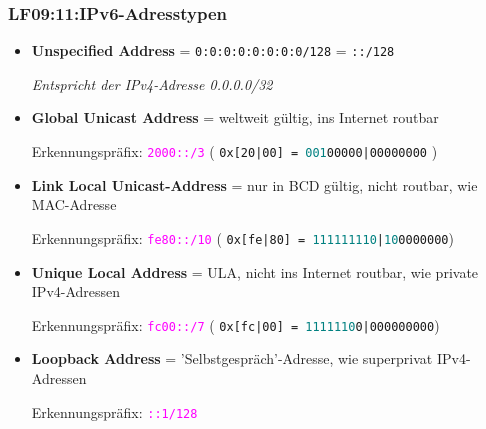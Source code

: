 \begin{frame}
  \frametitle{LF09:11:IPv6-Adresstypen}

  \begin{footnotesize}

  \begin{itemize}
    \item \textbf{Unspecified Address} = \texttt{0:0:0:0:0:0:0:0/128} = \texttt{::/128} \\
    \begin{tiny}{\textit{ Entspricht der IPv4-Adresse 0.0.0.0/32}}\end{tiny}

    \item \textbf{Global Unicast Address} =  weltweit gültig, ins Internet routbar \\
    \begin{tiny}{Erkennungspräfix: \textcolor{magenta}{\texttt{2000::/3}} 
      ( \texttt{0x[20|00] = \textcolor{teal}{001}00000|00000000} })
    \end{tiny}

    \item \textbf{Link Local Unicast-Address} = nur in BCD gültig, nicht routbar, wie MAC-Adresse\\
    \begin{tiny}{Erkennungspräfix: \textcolor{magenta}{\texttt{fe80::/10}} 
      ( \texttt{0x[fe|80] = \textcolor{teal}{111111110}|\textcolor{teal}{10}0000000})}
    \end{tiny}

    \item \textbf{Unique Local Address} = ULA, nicht ins Internet routbar, wie private IPv4-Adressen \\
    \begin{tiny}{Erkennungspräfix: \textcolor{magenta}{\texttt{fc00::/7}} 
      ( \texttt{0x[fc|00] = \textcolor{teal}{1111110}0|000000000})}\end{tiny}
    
    \item \textbf{Loopback Address} = 'Selbstgespräch'-Adresse, wie superprivat IPv4-Adressen \\
    \begin{tiny}Erkennungspräfix: \textcolor{magenta}{\texttt{::1/128}} \end{tiny}


  \end{itemize}

  \begin{tiny}


\end{tiny}
\end{footnotesize}
\end{frame}

